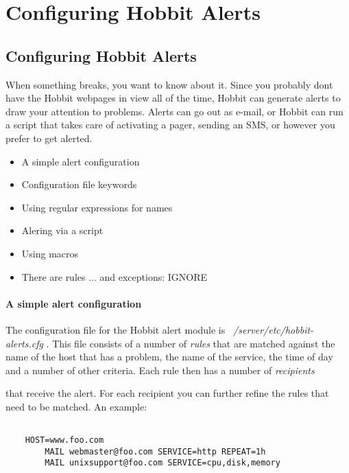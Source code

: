 \chapter{Configuring Hobbit Alerts}
\label{chap:Alerts}

\section*{Configuring Hobbit Alerts}


 When something breaks, you want to know about it. Since you probably
 dont have the Hobbit webpages in view all of the time, Hobbit can
 generate alerts to draw your attention to problems. Alerts can go out
 as e-mail, or Hobbit can run a script that takes care of activating a
 pager, sending an SMS, or however you prefer to get alerted.


\begin{itemize}
\item A simple alert configuration
\item Configuration file keywords
\item Using regular expressions for names
\item Alering via a script
\item Using macros
\item There are rules ... and exceptions: IGNORE

\end{itemize}
\subsubsection*{A simple alert configuration}


 The configuration file for the Hobbit alert module is \emph{~/server/etc/hobbit-alerts.cfg}
. This file consists of a number of \emph{rules}
 that are matched against the name of the host that has a problem, the
 name of the service, the time of day and a number of other
 criteria. Each rule then has a number of \emph{recipients}

 that receive the alert. For each recipient you can further refine the
 rules that need to be matched. An example:

\begin{verbatim}

	HOST=www.foo.com
		MAIL webmaster@foo.com SERVICE=http REPEAT=1h
		MAIL unixsupport@foo.com SERVICE=cpu,disk,memory

\end{verbatim}


